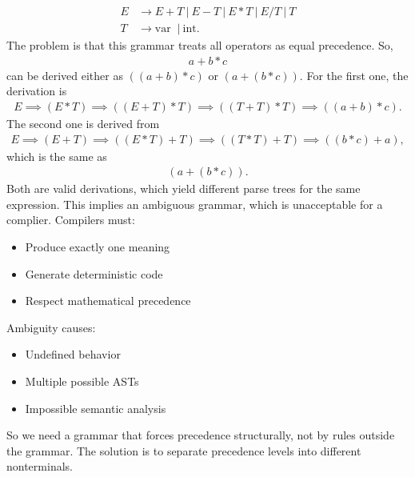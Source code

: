 \documentclass{report}
\begin{document}
\begin{itemize}
            \begin{align*}
                E &\to E + T\ |\ E - T\ | \ E*T \ | \ E/T \ |\ T \\
                T &\to \text{var }\ | \ \text{int}
            .\end{align*}
            The problem is that this grammar treats all operators as equal precedence. So,
            \begin{align*}
                a + b * c
            \end{align*}
            can be derived either as $((a+b) * c)$ or $(a + (b*c))$. For the first one, the derivation is 
            \begin{align*}
                E \implies (E*T) \implies ((E+T) * T) \implies ((T+T)*T) \implies ((a+b) * c)
            .\end{align*}
            The second one is derived from
            \begin{align*}
                E \implies (E+T) \implies ((E*T)+T) \implies ((T*T) + T) \implies ((b*c) + a) 
            ,\end{align*}
            which is the same as 
            \begin{align*}
                (a + (b*c))
            .\end{align*}
            Both are valid derivations, which yield different parse trees for the same expression. This implies an ambiguous grammar, which is unacceptable for a complier.
            \bigbreak \noindent 
            Compilers must:
            \begin{itemize}
                \item Produce exactly one meaning
                \item Generate deterministic code
                \item Respect mathematical precedence
            \end{itemize}
            Ambiguity causes:
            \begin{itemize}
                \item Undefined behavior
                \item Multiple possible ASTs
                \item Impossible semantic analysis
            \end{itemize}
            So we need a grammar that forces precedence structurally, not by rules outside the grammar.
            \bigbreak \noindent 
            The solution is to separate precedence levels into different nonterminals.

\end{itemize}
\end{document}
